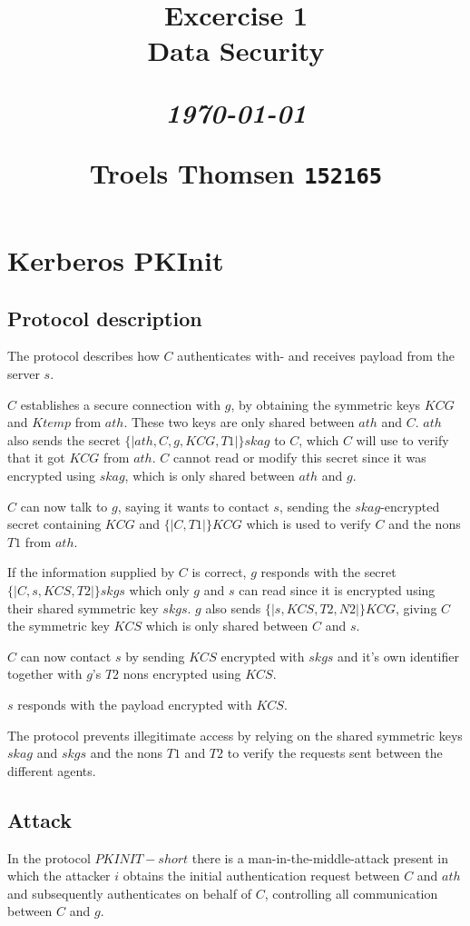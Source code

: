 \documentclass[12pt]{article}
\title{
  \vspace{4cm}
  \begin{flushleft}
  \Large{\textbf{Excercise 1}} \\
  \large{Data Security}
  \end{flushleft}
  \vspace{0cm}
  \begin{flushleft}
  \small
  \textit{\today}
  \end{flushleft}
  \vspace{12cm}
  \begin{flushleft}
  \small
  Troels Thomsen \texttt{152165}
  \end{flushleft}
}
\date{
}
\begin{document}
\clearpage
{}
\thispagestyle{empty}
\maketitle

\newpage


\section{Kerberos PKInit}

\subsection{Protocol description}
\label{sub:Protocol description}

The protocol describes how $C$ authenticates with- and receives payload from the server $s$.

$C$ establishes a secure connection with $g$, by obtaining the symmetric keys $KCG$ and $Ktemp$ from $ath$. These two keys are only shared between $ath$ and $C$. $ath$ also sends the secret $\{|ath,C,g,KCG,T1|\}skag$ to $C$, which $C$ will use to verify that it got $KCG$ from $ath$. $C$ cannot read or modify this secret since it was encrypted using $skag$, which is only shared between $ath$ and $g$.

$C$ can now talk to $g$, saying it wants to contact $s$, sending the $skag$-encrypted secret containing $KCG$ and $\{|C,T1|\}KCG$ which is used to verify $C$ and the nons $T1$ from $ath$.

If the information supplied by $C$ is correct, $g$ responds with the secret $\{|C,s,KCS,T2|\}skgs$ which only $g$ and $s$ can read since it is encrypted using their shared symmetric key $skgs$.
$g$ also sends $\{|s,KCS,T2,N2|\}KCG$, giving $C$ the symmetric key $KCS$ which is only shared between $C$ and $s$.

$C$ can now contact $s$ by sending $KCS$ encrypted with $skgs$ and it's own identifier together with $g$'s $T2$ nons encrypted using $KCS$.

$s$ responds with the payload encrypted with $KCS$.

The protocol prevents illegitimate access by relying on the shared symmetric keys $skag$ and $skgs$ and the nons $T1$ and $T2$ to verify the requests sent between the different agents.

\subsection{Attack}
\label{sub:Attack}
In the protocol $PKINIT-short$ there is a man-in-the-middle-attack present in which the attacker $i$ obtains the initial authentication request between $C$ and $ath$ and subsequently authenticates on behalf of $C$, controlling all communication between $C$ and $g$.
\end{document}
